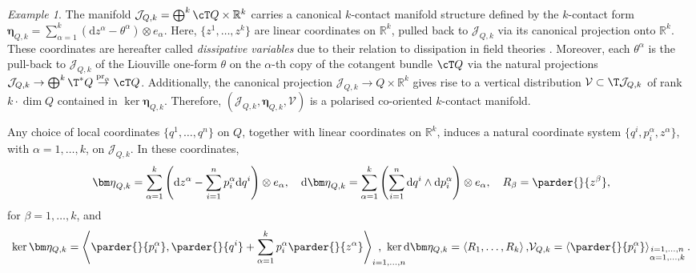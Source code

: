 \documentclass[11pt,a4paper]{article}
\newcommand{\dd}{\mathrm{d}}
\theoremstyle{plain} \newtheorem{theorem}{Theorem}[section] \newtheorem{proposition}[theorem]{Proposition} \newtheorem{corollary}[theorem]{Corollary} \newtheorem{lemma}[theorem]{Lemma} \theoremstyle{definition} \newtheorem{definition}[theorem]{Definition} \theoremstyle{remark} \newtheorem{remark}[theorem]{Remark} \newtheorem{example}[theorem]{Example} %
\begin{document}
\begin{example} 
\label{ex:canonical-k-contact-structure}
\rm
The manifold $\mathcal{J}_{Q,k} = \bigoplus^k \cT Q \times \mathbb{R}^k$ carries a canonical $k$-contact manifold structure defined by the $k$-contact form
\(
\bm\eta_{Q,k} = \sum_{\alpha=1}^k (\dd z^\alpha - \theta^\alpha) \otimes e_\alpha.
\)
Here, $\{z^1,\ldots,z^k\}$ are linear coordinates on $\mathbb{R}^k$, pulled back to $\mathcal{J}_{Q,k}$ via its canonical projection onto $\mathbb{R}^k$. These coordinates are hereafter called {\it dissipative variables} due to their relation to dissipation in field theories \cite{Riv_22}. Moreover, each $\theta^\alpha$ is the pull-back to $\mathcal{J}_{Q,k}$ of the Liouville one-form $\theta$ on the $\alpha$-th copy of the cotangent bundle $\cT Q$ via the natural projections $\mathcal{J}_{Q,k}\to \bigoplus^k\T^*Q\stackrel{{\rm pr}_\alpha}{\rightarrow} \cT Q$. Additionally, the canonical projection $\mathcal{J}_{Q,k}\rightarrow  Q\times \mathbb{R}^k$ gives rise to a vertical distribution $\mathcal{V}\subset \T\mathcal{J}_{Q,k}$ of rank $k \cdot \dim Q$ contained in $\ker \bm\eta_{Q,k}$. Therefore, $\left(\mathcal{J}_{Q,k}, \bm\eta_{Q,k}, \mathcal{V}\right)$ is a polarised co-oriented $k$-contact manifold.

Any choice of local coordinates $\{q^1,\ldots,q^n\}$ on $Q$, together with linear coordinates on $\mathbb{R}^k$, induces a natural coordinate system $\{q^i, p_i^\alpha, z^\alpha\}$, with $\alpha = 1,\ldots,k$,  on $\mathcal{J}_{Q,k}$. In these coordinates,
\[
{\bm \eta}_{Q,k}= \sum_{\alpha=1}^k\left(\dd z^\alpha - \sum_{i=1}^n p_i^\alpha \dd q^i\right)\otimes e_\alpha,\quad
\dd {\bm \eta}_{Q,k}= \sum_{\alpha=1}^k\left(\sum_{i=1}^n\dd q^i \wedge \dd p_i^\alpha\right)\otimes e_\alpha,\quad
R_\beta = \parder{}{z^\beta},
\]
for \(\beta = 1,\ldots,k\), and
\[
\ker \bm\eta_{Q,k} =
\left\langle
\parder{}{p_i^\alpha},
\parder{}{q^i} + \sum_{\alpha=1}^k p_i^\alpha \parder{}{z^\alpha}
\right\rangle_{ i = 1,\ldots,n}\!\!\!\!\!\!\!\!\!\!\!\!\!\!\!\!,\!\!\!\!\quad
\ker \dd \bm\eta_{Q,k} =
\left\langle
R_1,\ldots,R_k
\right\rangle,
\!
\mathcal{V}_{Q,k}=\left\langle\parder{}{p^\alpha_i}\right\rangle_{\substack{i=1,\ldots,n\\\alpha=1,\ldots,k}} .
\]
\end{example}
\end{document}
